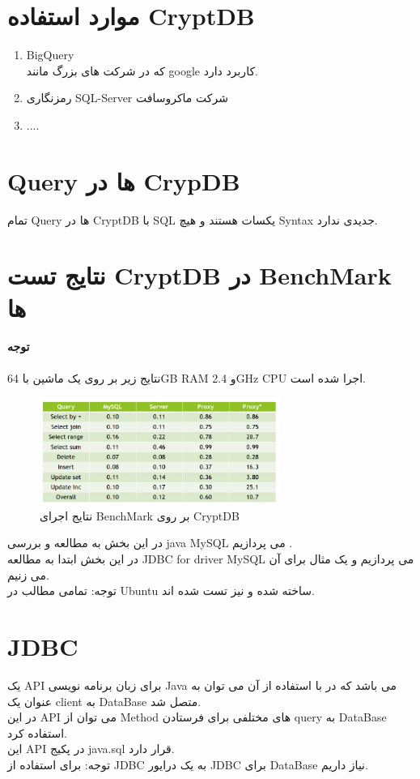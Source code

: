 \documentclass[a4paper]{article}
\begin{document}
		
		
		\section{موارد استفاده CryptDB}
		\begin{enumerate}
			\item
			BigQuery\\
			که در شرکت های بزرگ مانند google
			کاربرد دارد.
			\item
			رمزنگاری SQL-Server
			شرکت ماکروسافت
			\item ....
		\end{enumerate}
		
		
		
		\section{Query ها در CrypDB}
		تمام Query 
		ها در 
		CryptDB
		با SQL
		یکسات هستند و هیچ Syntax جدیدی ندارد.
		
		\section{نتایج تست CryptDB در BenchMark ها}
		\paragraph{توجه}
		نتایج زیر بر روی یک ماشین با 64GB RAM و 2.4GHz CPU اجرا شده است.
		
		\begin{figure}[h]
			\centering
			\includegraphics[width=0.7\textwidth]{im8.jpg}
			\caption{نتایج اجرای BenchMark بر روی CryptDB}
		\end{figure}
		
			\newpage
			در این بخش به مطالعه و بررسی 
		 java MySQL
			می پردازیم .\\
			در این بخش ابتدا به مطالعه
			JDBC  for driver MySQL
			می پردازیم و یک مثال برای آن می زنیم.\\
			توجه: تمامی مطالب در 
			Ubuntu
			ساخته شده و نیز تست شده اند.
			\section{JDBC}
			یک 
			API
			برای زبان برنامه نویسی Java می باشد که در با استفاده از آن می توان به عنوان یک
			client
			به 
			DataBase
			متصل شد.\\
			در این API می توان از Method های مختلفی برای فرستادن query به DataBase استفاده کرد.\\
			این 
			API
			در پکیج 
			java.sql
			قرار دارد.\\
			توجه: برای استفاده از 
			JDBC
			به یک درایور JDBC برای DataBase نیاز داریم.\\
			
\end{document}
